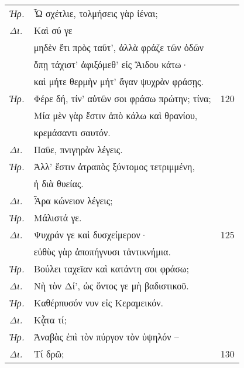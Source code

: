 \documentclass[13pt]{article}
\begin{document}
\begin{greek}
\begin{multicols}{2}
\begin{parcolumns}[colwidths={1=1.5em, 2=0.9\linewidth}]{2}
\end{parcolumns}
\end{multicols}


\newpage

\begin{spacing}{1.5}

\begin{tabularx}{\textwidth}{@{}lXr@{}}
  \textit{Ἡρ.} & Ὦ σχέτλιε, τολμήσεις γὰρ ἰέναι; & \\
  \textit{Δι.} & \hspace*{13.5em}Καὶ σύ γε & \\
  & μηδὲν ἔτι πρὸς ταῦτ', ἀλλὰ φράζε τῶν ὁδῶν & \\
  & ὅπῃ τάχιστ' ἀφιξόμεθ' εἰς Ἅιδου κάτω· & \\
  & καὶ μήτε θερμὴν μήτ' ἄγαν ψυχρὰν φράσῃς. & \\
  \textit{Ἡρ.} & Φέρε δή, τίν' αὐτῶν σοι φράσω πρώτην; τίνα; & 120 \\
  & Μία μὲν γὰρ ἔστιν ἀπὸ κάλω καὶ θρανίου, & \\
  & κρεμάσαντι σαυτόν. & \\
  \textit{Δι.} & \hspace*{8.5em}Παῦε, πνιγηρὰν λέγεις. & \\
  \textit{Ἡρ.} & Ἀλλ' ἔστιν ἀτραπὸς ξύντομος τετριμμένη, & \\
  & ἡ διὰ θυείας. & \\
  \textit{Δι.} & \hspace*{5.5em}Ἆρα κώνειον λέγεις; & \\
  \textit{Ἡρ.} & Μάλιστά γε. & \\
  \textit{Δι.} & \hspace*{5.5em}Ψυχράν γε καὶ δυσχείμερον· & 125 \\
  & εὐθὺς γὰρ ἀποπήγνυσι τἀντικνήμια. & \\
  \textit{Ἡρ.} & Βούλει ταχεῖαν καὶ κατάντη σοι φράσω; & \\
  \textit{Δι.} & Νὴ τὸν Δί', ὡς ὄντος γε μὴ βαδιστικοῦ. & \\
  \textit{Ἡρ.} & Καθέρπυσόν νυν εἰς Κεραμεικόν. & \\
  \textit{Δι.} & \hspace*{14em}Κᾆτα τί; & \\
  \textit{Ἡρ.} & Ἀναβὰς ἐπὶ τὸν πύργον τὸν ὑψηλόν –   & \\
  \textit{Δι.} & \hspace*{16em}Τί δρῶ; & 130 \\

\end{tabularx}


\end{spacing}
\end{greek}
\end{document}
